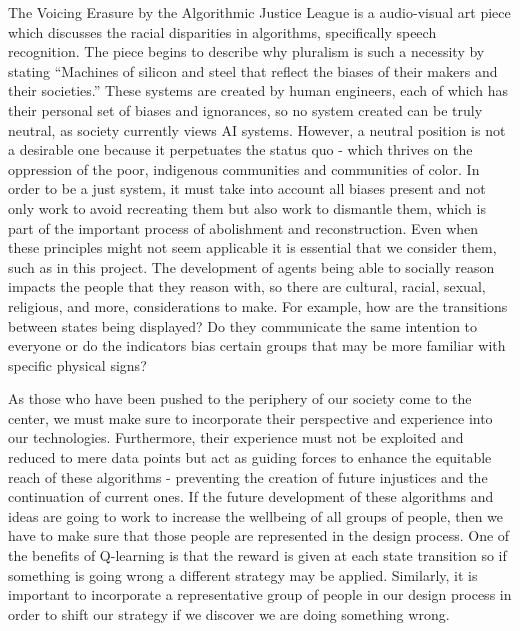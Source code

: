 \documentclass[10pt,twocolumn]{article}
\begin{document}
The Voicing Erasure by the Algorithmic Justice League \cite{Koenecke2019, Koenecke2020} is a audio-visual art piece which discusses the racial disparities in algorithms, specifically speech recognition.
The piece begins to describe why pluralism is such a necessity by stating “Machines of silicon and steel that reflect the biases of their makers and their societies.”
These systems are created by human engineers, each of which has their personal set of biases and ignorances, so no system created can be truly neutral, as society currently views AI systems.
However, a neutral position is not a desirable one because it perpetuates the status quo - which thrives on the oppression of the poor, indigenous communities and communities of color.
In order to be a just system, it must take into account all biases present and not only work to avoid recreating them but also work to dismantle them, which is part of the important process of abolishment and reconstruction.
Even when these principles might not seem applicable it is essential that we consider them, such as in this project.
The development of agents being able to socially reason impacts the people that they reason with, so there are cultural, racial, sexual, religious, and more, considerations to make.
For example, how are the transitions between states being displayed?
Do they communicate the same intention to everyone or do the indicators bias certain groups that may be more familiar with specific physical signs?

As those who have been pushed to the periphery of our society come to the center, we must make sure to incorporate their perspective and experience into our technologies. Furthermore, their experience must not be exploited and reduced to mere data points but act as guiding forces to enhance the equitable reach of these algorithms - preventing the creation of future injustices and the continuation of current ones.
If the future development of these algorithms and ideas are going to work to increase the wellbeing of all groups of people, then we have to make sure that those people are represented in the design process.
One of the benefits of Q-learning is that the reward is given at each state transition so if something is going wrong a different strategy may be applied.
Similarly, it is important to incorporate a representative group of people in our design process in order to shift our strategy if we discover we are doing something wrong.
\end{document}
